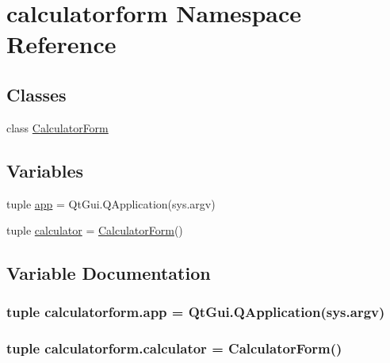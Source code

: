 \hypertarget{namespacecalculatorform}{}\section{calculatorform Namespace Reference}
\label{namespacecalculatorform}
\subsection*{Classes}
\begin{DoxyCompactItemize}
\item 
class \hyperlink{classcalculatorform_1_1CalculatorForm}{Calculator\+Form}
\end{DoxyCompactItemize}
\subsection*{Variables}
\begin{DoxyCompactItemize}
\item 
tuple \hyperlink{namespacecalculatorform_a1c7ba6f549c6bf5e3baafede41449793}{app} = Qt\+Gui.\+Q\+Application(sys.\+argv)
\item 
tuple \hyperlink{namespacecalculatorform_a9d2adc5a92a4a223cc5df3119a24d8ba}{calculator} = \hyperlink{classcalculatorform_1_1CalculatorForm}{Calculator\+Form}()
\end{DoxyCompactItemize}


\subsection{Variable Documentation}
\hypertarget{namespacecalculatorform_a1c7ba6f549c6bf5e3baafede41449793}{}
\subsubsection[{app}]{\setlength{\rightskip}{0pt plus 5cm}tuple calculatorform.\+app = Qt\+Gui.\+Q\+Application(sys.\+argv)}\label{namespacecalculatorform_a1c7ba6f549c6bf5e3baafede41449793}
\hypertarget{namespacecalculatorform_a9d2adc5a92a4a223cc5df3119a24d8ba}{}
\subsubsection[{calculator}]{\setlength{\rightskip}{0pt plus 5cm}tuple calculatorform.\+calculator = {\bf Calculator\+Form}()}\label{namespacecalculatorform_a9d2adc5a92a4a223cc5df3119a24d8ba}
